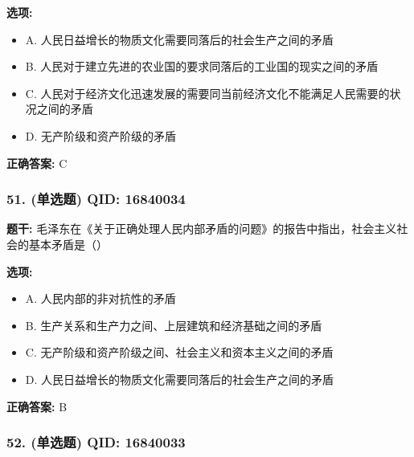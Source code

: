 \documentclass[12pt,UTF8]{ctexart}
\begin{document}
\textbf{选项:}
\begin{itemize}[leftmargin=*]

  \item A. 人民日益增长的物质文化需要同落后的社会生产之间的矛盾

  \item B. 人民对于建立先进的农业国的要求同落后的工业国的现实之间的矛盾

  \item C. 人民对于经济文化迅速发展的需要同当前经济文化不能满足人民需要的状况之间的矛盾

  \item D. 无产阶级和资产阶级的矛盾

\end{itemize}

\textbf{正确答案:}
C

\vspace{0.3em}\hrulefill\vspace{0.7em}

\subsubsection*{51. (单选题) \small QID: 16840034}

\textbf{题干:}
毛泽东在《关于正确处理人民内部矛盾的问题》的报告中指出，社会主义社会的基本矛盾是（）

\textbf{选项:}
\begin{itemize}[leftmargin=*]

  \item A. 人民内部的非对抗性的矛盾

  \item B. 生产关系和生产力之间、上层建筑和经济基础之间的矛盾

  \item C. 无产阶级和资产阶级之间、社会主义和资本主义之间的矛盾

  \item D. 人民日益增长的物质文化需要同落后的社会生产之间的矛盾

\end{itemize}

\textbf{正确答案:}
B

\vspace{0.3em}\hrulefill\vspace{0.7em}

\subsubsection*{52. (单选题) \small QID: 16840033}
\end{document}
